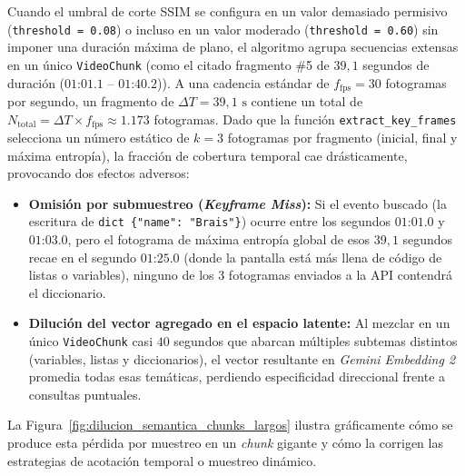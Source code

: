 Cuando el umbral de corte SSIM se configura en un valor demasiado permisivo (\texttt{threshold = 0.08}) o incluso en un valor moderado (\texttt{threshold = 0.60}) sin imponer una duración máxima de plano, el algoritmo agrupa secuencias extensas en un único \texttt{VideoChunk} (como el citado fragmento \#5 de $39,1$ segundos de duración ($01\text{:}01.1\text{ -- }01\text{:}40.2$)). %
A una cadencia estándar de $f_{\text{fps}} = 30$ fotogramas por segundo, un fragmento de $\Delta T = 39,1\text{ s}$ contiene un total de $N_{\text{total}} = \Delta T \times f_{\text{fps}} \approx 1.173$ fotogramas. %
Dado que la función \texttt{extract\_key\_frames} selecciona un número estático de $k = 3$ fotogramas por fragmento (inicial, final y máxima entropía), la fracción de cobertura temporal cae drásticamente, provocando dos efectos adversos: %
\begin{itemize}
    \item \textbf{Omisión por submuestreo (\textit{Keyframe Miss}):} Si el evento buscado (la escritura de \texttt{dict \{"name": "Brais"\}}) ocurre entre los segundos $01\text{:}01.0$ y $01\text{:}03.0$, pero el fotograma de máxima entropía global de esos $39,1$ segundos recae en el segundo $01\text{:}25.0$ (donde la pantalla está más llena de código de listas o variables), ninguno de los $3$ fotogramas enviados a la API contendrá el diccionario. %
    \item \textbf{Dilución del vector agregado en el espacio latente:} Al mezclar en un único \texttt{VideoChunk} casi $40$ segundos que abarcan múltiples subtemas distintos (variables, listas y diccionarios), el vector resultante en \textit{Gemini Embedding 2} promedia todas esas temáticas, perdiendo especificidad direccional frente a consultas puntuales. %
\end{itemize}

La Figura~\ref{fig:dilucion_semantica_chunks_largos} ilustra gráficamente cómo se produce esta pérdida por muestreo en un \textit{chunk} gigante y cómo la corrigen las estrategias de acotación temporal o muestreo dinámico. %


